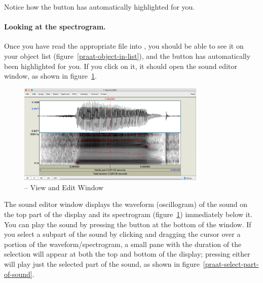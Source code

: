 Notice how the button  has automatically highlighted for you.


\paragraph{Looking at the spectrogram.} Once you have read the appropriate file into \Praat{}, you should be able to see it on your object list (figure~\ref{praat-object-in-list}), and the button  has automatically been highlighted for you. If you click on it, it should open the sound editor window, as shown in figure~\ref{praat-view-and-edit}.

\begin{figure}[!tbp]
\caption{\Praat{} -- View and Edit Window}
\label{praat-view-and-edit}
	\begin{center}
		\includegraphics[width=0.8\textwidth]{./figures/Praat-05-View-and-edit}
	\end{center}
\end{figure}

The sound editor window displays the waveform (oscillogram) of the sound on the top part of the display and its spectrogram (figure~\ref{praat-view-and-edit}) immediately below it. You can play the sound by pressing the  button at the bottom of the window. If you select a subpart of the sound by clicking and dragging the cursor over a portion of the waveform/spectrogram, a small pane with the duration of the selection will appear at both the top and bottom of the display; pressing either will play just the selected part of the sound, as shown in figure~\ref{praat-select-part-of-sound}.

